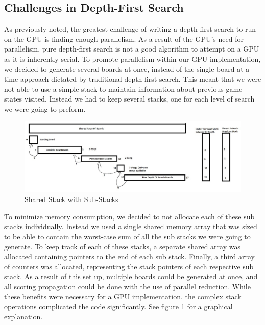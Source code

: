 \documentclass[11pt]{article}
\begin{document}
\subsection{Challenges in Depth-First Search}
As previously noted, the greatest challenge of writing a depth-first search to run on the GPU is finding enough parallelism.
As a result of the GPU's need for parallelism, pure depth-first search is not a good algorithm to attempt on a GPU as it is inherently serial.
To promote parallelism within our GPU implementation, we decided to generate several boards at once, instead of the single board at a time approach dictated by traditional depth-first search.
This meant that we were not able to use a simple stack to maintain information about previous game states visited. Instead we had to keep several stacks, one for each level of search
we were going to preform. 

\begin{figure}[!ht]
    \begin{center}
        \includegraphics[width=1\textwidth]{pictures/Picture_of_Stack.jpg}
        \caption{Shared Stack with Sub-Stacks}
        \label{fig:stackPicture}
    \end{center}
\end{figure}

    To minimize memory consumption, we decided to not allocate each of these sub stacks individually. Instead we used a single shared memory array that was sized to be able to contain
the worst-case sum of all the sub stacks we were going to generate. To keep track of each of these stacks, a separate shared array was allocated containing pointers to the end of each sub stack.
Finally, a third array of counters was allocated, representing the stack pointers of each respective sub stack. As a result of this set up, multiple boards could be generated at once, and all scoring
propagation could be done with the use of parallel reduction. While these benefits were necessary for a GPU implementation, the complex stack operations complicated the code
significantly. See figure \ref{fig:stackPicture} for a graphical explanation.
    
\end{document}
